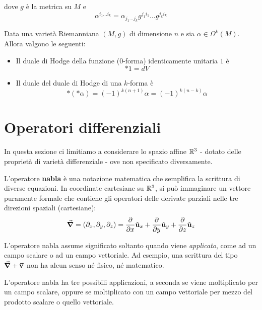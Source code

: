 dove $g$ è la metrica su $M$ e
\begin{equation*}
\alpha^{i_1\ldots i_k}=\alpha_{j_1\ldots j_k}g^{j_1i_1}\ldots g^{j_ki_k}
\end{equation*}
\begin{properties}
	Data una varietà Riemanniana $(M,g)$ di dimensione $n$ e sia $\alpha\in\Omega^k(M)$. Allora valgono le seguenti:
	\begin{itemize}
		\item Il duale di Hodge della funzione ($0$-forma) identicamente unitaria $1$ è
		\begin{equation}
			\ast 1=dV
		\end{equation}
		\item Il duale del duale di Hodge di una $k$-forma è
		\begin{equation}
			\ast\left(\ast\alpha\right)=\left(-1\right)^{k\left(n+1\right)}\alpha=\left(-1\right)^{k\left(n-k\right)}\alpha
		\end{equation}
		\end{itemize}
\end{properties}
\section{Operatori differenziali}
In questa sezione ci limitiamo a considerare lo spazio affine $\mathbb{R}^3$ - dotato delle proprietà di varietà differenziale - ove non specificato diversamente.
\begin{define}
	L'operatore \textbf{nabla}	è una notazione matematica che semplifica la scrittura di diverse equazioni. In coordinate cartesiane su $\mathbb{R}^3$, si può immaginare un vettore puramente formale che contiene gli operatori delle derivate parziali nelle tre direzioni spaziali (cartesiane):
	\begin{equation}
		\grad = \left(\partial_x,\partial_y,\partial_z\right)=\pdv{x}\hat{\mathbf{u}}_x+\pdv{y}\hat{\mathbf{u}}_y+\pdv{z}\hat{\mathbf{u}}_z\label{nablacartesiano}
	\end{equation}
\end{define}
\begin{attention}
	L'operatore nabla assume significato soltanto quando viene \textit{applicato}, come ad un campo scalare o ad un campo vettoriale. Ad esempio, una scrittura del tipo $\grad + \vb*{\va{v}}$ non ha alcun senso né fisico, né matematico.
\end{attention}
L'operatore nabla ha tre possibili applicazioni, a seconda se viene moltiplicato per un campo scalare, oppure se moltiplicato con un campo vettoriale per mezzo del prodotto scalare o quello vettoriale.
